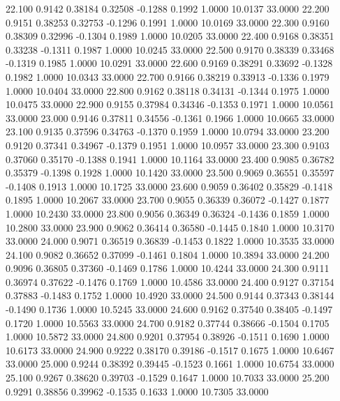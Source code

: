   22.100   0.9142   0.38184   0.32508  -0.1288   0.1992   1.0000  10.0137  33.0000
  22.200   0.9151   0.38253   0.32753  -0.1296   0.1991   1.0000  10.0169  33.0000
  22.300   0.9160   0.38309   0.32996  -0.1304   0.1989   1.0000  10.0205  33.0000
  22.400   0.9168   0.38351   0.33238  -0.1311   0.1987   1.0000  10.0245  33.0000
  22.500   0.9170   0.38339   0.33468  -0.1319   0.1985   1.0000  10.0291  33.0000
  22.600   0.9169   0.38291   0.33692  -0.1328   0.1982   1.0000  10.0343  33.0000
  22.700   0.9166   0.38219   0.33913  -0.1336   0.1979   1.0000  10.0404  33.0000
  22.800   0.9162   0.38118   0.34131  -0.1344   0.1975   1.0000  10.0475  33.0000
  22.900   0.9155   0.37984   0.34346  -0.1353   0.1971   1.0000  10.0561  33.0000
  23.000   0.9146   0.37811   0.34556  -0.1361   0.1966   1.0000  10.0665  33.0000
  23.100   0.9135   0.37596   0.34763  -0.1370   0.1959   1.0000  10.0794  33.0000
  23.200   0.9120   0.37341   0.34967  -0.1379   0.1951   1.0000  10.0957  33.0000
  23.300   0.9103   0.37060   0.35170  -0.1388   0.1941   1.0000  10.1164  33.0000
  23.400   0.9085   0.36782   0.35379  -0.1398   0.1928   1.0000  10.1420  33.0000
  23.500   0.9069   0.36551   0.35597  -0.1408   0.1913   1.0000  10.1725  33.0000
  23.600   0.9059   0.36402   0.35829  -0.1418   0.1895   1.0000  10.2067  33.0000
  23.700   0.9055   0.36339   0.36072  -0.1427   0.1877   1.0000  10.2430  33.0000
  23.800   0.9056   0.36349   0.36324  -0.1436   0.1859   1.0000  10.2800  33.0000
  23.900   0.9062   0.36414   0.36580  -0.1445   0.1840   1.0000  10.3170  33.0000
  24.000   0.9071   0.36519   0.36839  -0.1453   0.1822   1.0000  10.3535  33.0000
  24.100   0.9082   0.36652   0.37099  -0.1461   0.1804   1.0000  10.3894  33.0000
  24.200   0.9096   0.36805   0.37360  -0.1469   0.1786   1.0000  10.4244  33.0000
  24.300   0.9111   0.36974   0.37622  -0.1476   0.1769   1.0000  10.4586  33.0000
  24.400   0.9127   0.37154   0.37883  -0.1483   0.1752   1.0000  10.4920  33.0000
  24.500   0.9144   0.37343   0.38144  -0.1490   0.1736   1.0000  10.5245  33.0000
  24.600   0.9162   0.37540   0.38405  -0.1497   0.1720   1.0000  10.5563  33.0000
  24.700   0.9182   0.37744   0.38666  -0.1504   0.1705   1.0000  10.5872  33.0000
  24.800   0.9201   0.37954   0.38926  -0.1511   0.1690   1.0000  10.6173  33.0000
  24.900   0.9222   0.38170   0.39186  -0.1517   0.1675   1.0000  10.6467  33.0000
  25.000   0.9244   0.38392   0.39445  -0.1523   0.1661   1.0000  10.6754  33.0000
  25.100   0.9267   0.38620   0.39703  -0.1529   0.1647   1.0000  10.7033  33.0000
  25.200   0.9291   0.38856   0.39962  -0.1535   0.1633   1.0000  10.7305  33.0000
